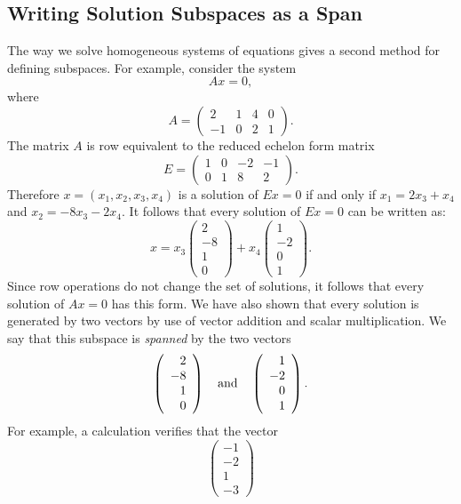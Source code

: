\documentclass{ximera}
\begin{document}
\subsection*{Writing Solution Subspaces as a Span}

The way we solve homogeneous systems of equations gives a second
method for defining subspaces.  For example, consider the system
\[
Ax=0,
\]
where
\[
A=\left(\begin{array}{rccc} 2 & 1 & 4 & 0 \\ -1 & 0 & 2 & 1
        \end{array}\right).
\]
The matrix $A$ is row equivalent to the reduced echelon form matrix
\[
E=\left(\begin{array}{ccrr} 1 & 0 & -2 & -1 \\ 0 & 1 & 8 & 2
        \end{array}\right).
\]
Therefore $x=(x_1,x_2,x_3,x_4)$ is a solution of $Ex=0$ if and
only if $x_1 = 2x_3+x_4$ and $x_2 = -8x_3 - 2x_4$.
It follows that every solution of $Ex=0$ can be written as:
\[
x = x_3\left(\begin{array}{r} 2 \\ -8\\ 1\\ 0 \end{array}\right)
+x_4\left(\begin{array}{r} 1 \\ -2\\ 0\\ 1 \end{array}\right).
\]
Since row operations do not change the set of solutions, it
follows that every solution of $Ax=0$ has this form. We have
also shown that every solution is generated by two vectors by
use of vector addition and
scalar multiplication.  We say that
this subspace is {\em spanned\/} by the two vectors
\[
\left(\begin{array}{r} 2 \\ -8\\ 1\\ 0 \end{array}\right)
\quad\mbox{and}\quad
\left(\begin{array}{r} 1 \\ -2\\ 0\\ 1 \end{array}\right).
\]
For example, a calculation verifies that the vector
\[
\left(\begin{array}{r} -1 \\ -2\\ 1\\ -3 \end{array}\right)
\]
\end{document}
